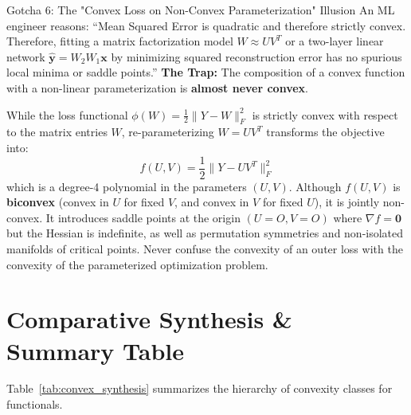 \begin{trapbox}{Gotcha 6: The "Convex Loss on Non-Convex Parameterization" Illusion}
An ML engineer reasons: ``Mean Squared Error is quadratic and therefore strictly convex. Therefore, fitting a matrix factorization model $W \approx U V^T$ or a two-layer linear network $\hat{\mathbf{y}} = W_2 W_1 \mathbf{x}$ by minimizing squared reconstruction error has no spurious local minima or saddle points.''
\tcblower
\textbf{The Trap:} The composition of a convex function with a non-linear parameterization is \textbf{almost never convex}. 

While the loss functional $\phi(W) = \frac{1}{2}\|Y - W\|_F^2$ is strictly convex with respect to the matrix entries $W$, re-parameterizing $W = U V^T$ transforms the objective into:
\begin{equation}
f(U, V) = \frac{1}{2}\|Y - U V^T\|_F^2
\end{equation}
which is a degree-4 polynomial in the parameters $(U, V)$. Although $f(U, V)$ is \textbf{biconvex} (convex in $U$ for fixed $V$, and convex in $V$ for fixed $U$), it is jointly non-convex. It introduces saddle points at the origin $(U=O, V=O)$ where $\nabla f = \mathbf{0}$ but the Hessian is indefinite, as well as permutation symmetries and non-isolated manifolds of critical points. Never confuse the convexity of an outer loss with the convexity of the parameterized optimization problem.
\end{trapbox}

\section{Comparative Synthesis \& Summary Table}

Table~\ref{tab:convex_synthesis} summarizes the hierarchy of convexity classes for functionals.

